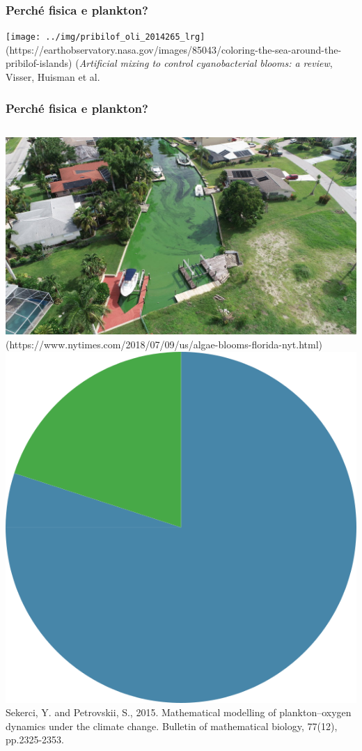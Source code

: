 \begin{frame}
  \frametitle{Perché fisica e plankton?}

  \texttt{[image: ../img/pribilof\_oli\_2014265\_lrg]}
  {\tiny (https://earthobservatory.nasa.gov/images/85043/coloring-the-sea-around-the-pribilof-islands)}
  {\tiny (\textit{Artificial mixing to control cyanobacterial blooms: a review}, Visser, Huisman et al.}

\end{frame}

\begin{frame}
  \frametitle{Perché fisica e plankton?}
  \begin{columns}

    \includegraphics[width=\textwidth]{../img/toxic_bloom_florida}
    \\
    {\tiny (https://www.nytimes.com/2018/07/09/us/algae-blooms-florida-nyt.html)}
    \includegraphics[width=\textwidth]{../img/70percO2}
    \\
    {\tiny Sekerci, Y. and Petrovskii, S., 2015. Mathematical modelling of plankton–oxygen dynamics under the climate change. Bulletin of mathematical biology, 77(12), pp.2325-2353.}




  \end{columns}
\end{frame}


